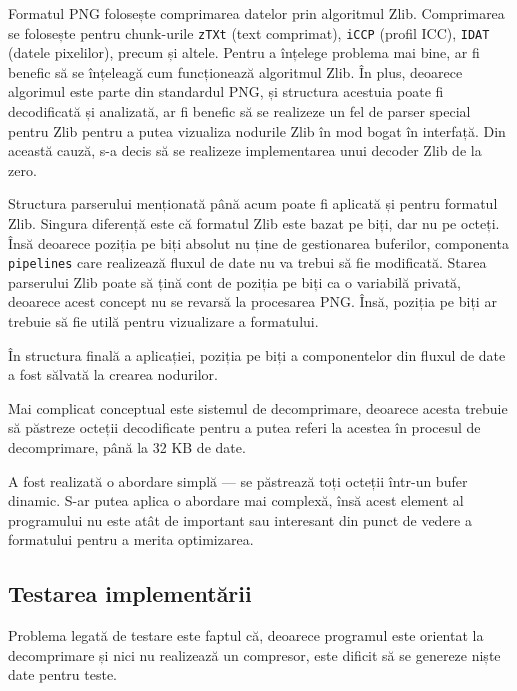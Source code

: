 \documentclass[a4paper,12pt]{report}
\begin{document}
Formatul \ac{PNG} folosește comprimarea datelor prin algoritmul Zlib.
Comprimarea se folosește pentru chunk-urile \texttt{zTXt} (text comprimat),
\texttt{iCCP} (profil \ac{ICC}), \texttt{IDAT} (datele pixelilor), precum și altele.
Pentru a înțelege problema mai bine, ar fi benefic să se înțeleagă cum funcționează algoritmul Zlib.
În plus, deoarece algorimul este parte din standardul \ac{PNG},
și structura acestuia poate fi decodificată și analizată,
ar fi benefic să se realizeze un fel de parser special pentru Zlib pentru a putea vizualiza nodurile Zlib
în mod bogat în interfață.
Din această cauză, s-a decis să se realizeze implementarea unui decoder Zlib de la zero.

Structura parserului menționată până acum poate fi aplicată și pentru formatul Zlib.
Singura diferență este că formatul Zlib este bazat pe biți, dar nu pe octeți.
Însă deoarece poziția pe biți absolut nu ține de gestionarea buferilor,
componenta \texttt{pipelines} care realizează fluxul de date nu va trebui să fie modificată.
Starea parserului Zlib poate să țină cont de poziția pe biți ca o variabilă privată, deoarece
acest concept nu se revarsă la procesarea \ac{PNG}.
Însă, poziția pe biți ar trebuie să fie utilă pentru vizualizare a formatului.

În structura finală a aplicației, poziția pe biți a componentelor din fluxul de date a fost sălvată la crearea nodurilor.

Mai complicat conceptual este sistemul de decomprimare,
deoarece acesta trebuie să păstreze octeții decodificate pentru a putea referi la acestea
în procesul de decomprimare, până la 32 KB de date.

A fost realizată o abordare simplă --- se păstrează toți octeții într-un bufer dinamic.
S-ar putea aplica o abordare mai complexă, însă acest element al programului
nu este atât de important sau interesant din punct de vedere a formatului pentru a merita optimizarea.

\subsection{Testarea implementării}

Problema legată de testare este faptul că, deoarece programul este orientat
la decomprimare și nici nu realizează un compresor,
este dificit să se genereze niște date pentru teste.
\end{document}
